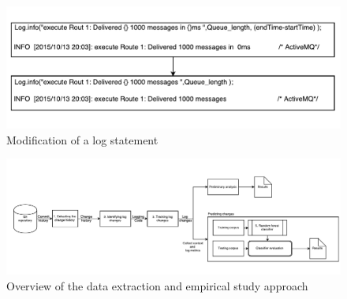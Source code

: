\begin{figure}[tb]
	\centering
	\includegraphics[width=1\columnwidth]{ExampleOfLogChange_LPA}
	\caption{Modification of a log statement}
	\label{fig:ExampleOfLogChange_LPA}
\end{figure}

\begin{figure}
	\centering
	\includegraphics[width=1\textwidth,
	height=.4\textwidth]{LogGenalogyMethdology}
	\caption{Overview of the data extraction and empirical study approach}
	\label{fig:LGmethod}
\end{figure}



